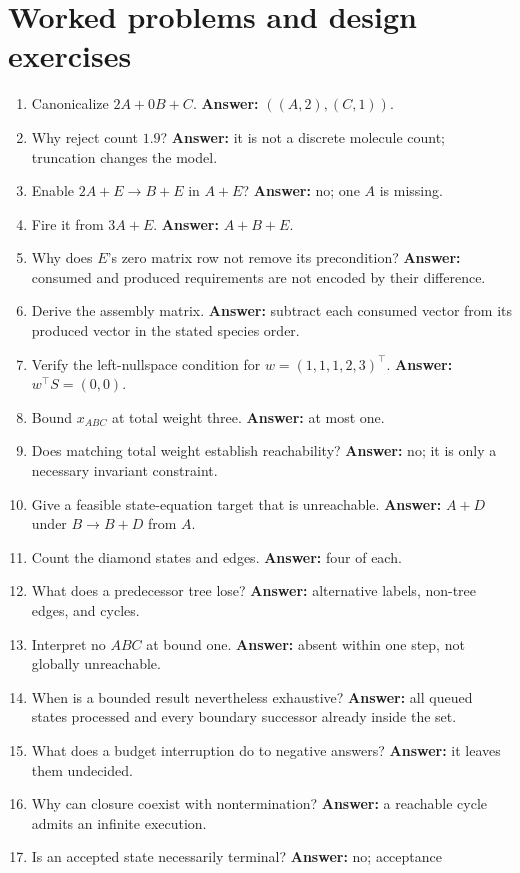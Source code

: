 \section{Worked problems and design exercises}
\begin{enumerate}
\item Canonicalize $2A+0B+C$. \textbf{Answer:} $((A,2),(C,1))$.
\item Why reject count $1.9$? \textbf{Answer:} it is not a discrete molecule count;
truncation changes the model.
\item Enable $2A+E\to B+E$ in $A+E$? \textbf{Answer:} no; one $A$ is missing.
\item Fire it from $3A+E$. \textbf{Answer:} $A+B+E$.
\item Why does $E$'s zero matrix row not remove its precondition?
\textbf{Answer:} consumed and produced requirements are not encoded by their difference.
\item Derive the assembly matrix. \textbf{Answer:} subtract each consumed vector
from its produced vector in the stated species order.
\item Verify the left-nullspace condition for $w=(1,1,1,2,3)^\top$. \textbf{Answer:}
$w^\top S=(0,0)$.
\item Bound $x_{ABC}$ at total weight three. \textbf{Answer:} at most one.
\item Does matching total weight establish reachability? \textbf{Answer:} no;
it is only a necessary invariant constraint.
\item Give a feasible state-equation target that is unreachable.
\textbf{Answer:} $A+D$ under $B\to B+D$ from $A$.
\item Count the diamond states and edges. \textbf{Answer:} four of each.
\item What does a predecessor tree lose? \textbf{Answer:} alternative labels,
non-tree edges, and cycles.
\item Interpret no $ABC$ at bound one. \textbf{Answer:} absent within one step,
not globally unreachable.
\item When is a bounded result nevertheless exhaustive? \textbf{Answer:} all
queued states processed and every boundary successor already inside the set.
\item What does a budget interruption do to negative answers?
\textbf{Answer:} it leaves them undecided.
\item Why can closure coexist with nontermination? \textbf{Answer:} a reachable
cycle admits an infinite execution.
\item Is an accepted state necessarily terminal? \textbf{Answer:} no; acceptance

\end{enumerate}
